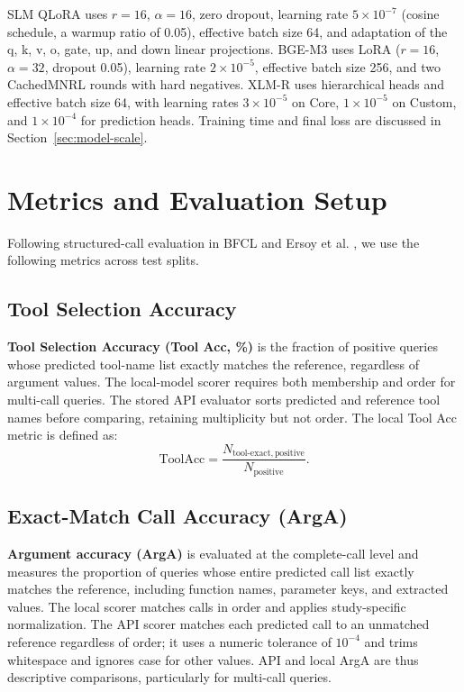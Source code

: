 \documentclass[10pt,twocolumn,a4paper]{article}
\begin{document}
SLM QLoRA uses $r=16$, $\alpha=16$, zero dropout, learning rate $5\times10^{-7}$ (cosine schedule, a warmup ratio of 0.05), effective batch size 64, and adaptation of the q, k, v, o, gate, up, and down linear projections. BGE-M3 uses LoRA ($r=16$, $\alpha=32$, dropout 0.05), learning rate $2\times10^{-5}$, effective batch size 256, and two CachedMNRL rounds with hard negatives. XLM-R uses hierarchical heads and effective batch size 64, with learning rates $3\times10^{-5}$ on Core, $1\times10^{-5}$ on Custom, and $1\times10^{-4}$ for prediction heads. Training time and final loss are discussed in Section~\ref{sec:model-scale}.

\section{Metrics and Evaluation Setup}
Following structured-call evaluation in BFCL \cite{yan2024bfcl} and Ersoy et al. \cite{ersoy2025tool}, we use the following metrics across test splits.

\subsection{Tool Selection Accuracy}
\textbf{Tool Selection Accuracy (Tool Acc, \%)} is the fraction of positive queries whose predicted tool-name list exactly matches the reference, regardless of argument values. The local-model scorer requires both membership and order for multi-call queries. The stored API evaluator sorts predicted and reference tool names before comparing, retaining multiplicity but not order. The local Tool Acc metric is defined as:
\[\mathrm{ToolAcc}=\frac{N_{\mathrm{tool\text{-}exact,positive}}}{N_{\mathrm{positive}}}.\]

\subsection{Exact-Match Call Accuracy (ArgA)}
\textbf{Argument accuracy (ArgA)} is evaluated at the complete-call level and measures the proportion of queries whose entire predicted call list exactly matches the reference, including function names, parameter keys, and extracted values. The local scorer matches calls in order and applies study-specific normalization. The API scorer matches each predicted call to an unmatched reference regardless of order; it uses a numeric tolerance of $10^{-4}$ and trims whitespace and ignores case for other values. API and local ArgA are thus descriptive comparisons, particularly for multi-call queries.
\end{document}
